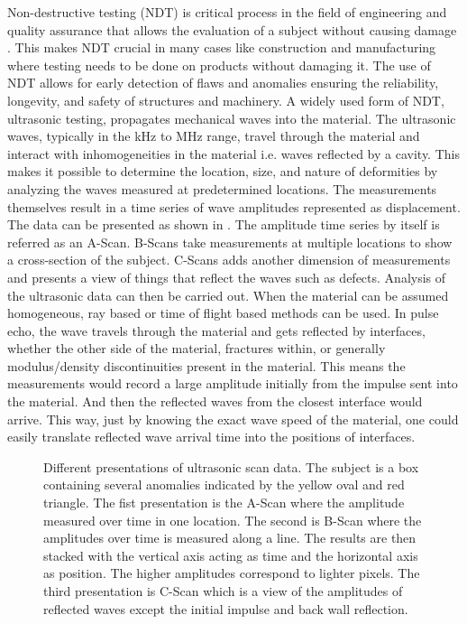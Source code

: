 \noindent Non-destructive testing (NDT) is critical process in the field of engineering and quality assurance that allows the evaluation of a subject without causing damage \autocite{howell2020nondestructive, maioUltrasoundPropagationComposite2022, bochudSparseDigitalSignal2015}. This makes NDT crucial in many cases like construction and manufacturing where testing needs to be done on products without damaging it. The use of NDT allows for early detection of flaws and anomalies ensuring the reliability, longevity, and safety of structures and machinery. A widely used form of NDT, ultrasonic testing, propagates mechanical waves into the material. The ultrasonic waves, typically in the kHz to MHz range, travel through the material and interact with inhomogeneities in the material i.e. waves reflected by a cavity. This makes it possible to determine the location, size, and nature of deformities by analyzing the waves measured at predetermined locations. The measurements themselves result in a time series of wave amplitudes represented as displacement. The data can be presented as shown in . The amplitude time series by itself is referred as an A-Scan. B-Scans take measurements at multiple locations to show a cross-section of the subject. C-Scans adds another dimension of measurements and presents a view of things that reflect the waves such as defects. Analysis of the ultrasonic data can then be carried out. When the material can be assumed homogeneous, ray based or time of flight based methods can be used. In pulse echo, the wave travels through the material and gets reflected by interfaces, whether the other side of the material, fractures within, or generally modulus/density discontinuities present in the material. This means the measurements would record a large amplitude initially from the impulse sent into the material. And then the reflected waves from the closest interface would arrive. This way, just by knowing the exact wave speed of the material, one could easily translate reflected wave arrival time into the positions of interfaces.

\begin{figure}[ht]
    \centering
    
    \caption{Different presentations of ultrasonic scan data. The subject is a box containing several anomalies indicated by the yellow oval and red triangle. The fist presentation is the A-Scan where the amplitude measured over time in one location. The second is B-Scan where the amplitudes over time is measured along a line. The results are then stacked with the vertical axis acting as time and the horizontal axis as position. The higher amplitudes correspond to lighter pixels. The third presentation is C-Scan which is a view of the amplitudes of reflected waves except the initial impulse and back wall reflection.}
    \label{fig:us_presentation}
\end{figure}

